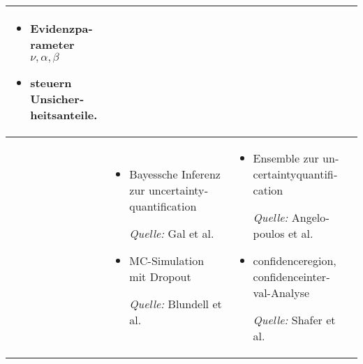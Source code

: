 \begin{otherlanguage}{ngerman}
\begin{table}[!htpb]
\begin{tabularx}{\textwidth}{|>{\centering\arraybackslash}l|X|X|X|}
    \begin{minipage}[t]{\linewidth}
    \vspace{0.3em}
    \begin{itemize}[leftmargin=*, label={}, itemsep=0.125em, topsep=0em, parsep=0em]
        \item Evidenzparameter \( \nu, \alpha, \beta \)
        \item steuern Unsicherheitsanteile.
    \end{itemize}
    \vspace{0.3em}
    \end{minipage} \\
    \hline

    \multirow{5}{*}{\textbf{C}} & 
    \begin{minipage}[t]{\linewidth}
    \vspace{0.3em}
    \begin{itemize}[leftmargin=*, label={}, itemsep=0.125em, topsep=0em, parsep=0em]
        \item Bayessche Inferenz zur \gls{uncertaintyquantification} \par
        \begin{scriptsize}\textit{Quelle:} Gal et al. \parencite*[S.~41–42]{gal2016uncertainty}\end{scriptsize}
        \item MC-Simulation mit Dropout \par
        \begin{scriptsize}\textit{Quelle:} Blundell et al. \parencite*{blundell2015weight}\end{scriptsize}
    \end{itemize}
    \vspace{0.3em}
    \end{minipage} &

    \begin{minipage}[t]{\linewidth}
    \vspace{0.3em}
    \begin{itemize}[leftmargin=*, label={}, itemsep=0.125em, topsep=0em, parsep=0em]
        \item Ensemble zur \gls{uncertaintyquantification} \par
        \begin{scriptsize}\textit{Quelle:} Angelopoulos et al. \parencite*{angelopoulos2021gentle}\end{scriptsize}
        \item \gls{confidenceregion}, \gls{confidenceinterval}-Analyse \par
        \begin{scriptsize}\textit{Quelle:} Shafer et al. \parencite*{shafer2008tutorial}\end{scriptsize}
    \end{itemize}
    \vspace{0.3em}
    \end{minipage} &


\end{tabularx}
\end{table}
\end{otherlanguage}
